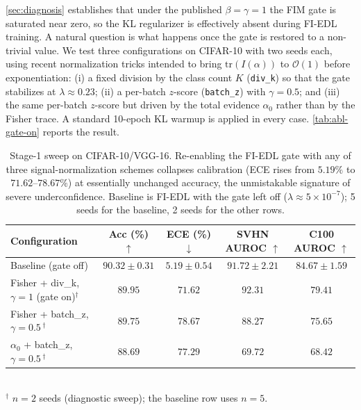 \documentclass[review,5p,times]{elsarticle}
\begin{document}
\autoref{sec:diagnosis} establishes that under the published
$\beta\!=\!\gamma\!=\!1$ the FIM gate is saturated near zero, so the KL
regularizer is effectively absent during FI-EDL training. A natural
question is what happens once the gate is restored to a non-trivial value.
We test three configurations on CIFAR-10 with two seeds each, using
recent normalization tricks intended to bring $\mathrm{tr}(I(\alpha))$ to
$\mathcal{O}(1)$ before exponentiation: (i) a fixed division by the class
count $K$ (\texttt{div\_k}) so that the gate stabilizes at
$\lambda\!\approx\!0.23$; (ii) a per-batch $z$-score
(\texttt{batch\_z}) with $\gamma\!=\!0.5$; and (iii) the same per-batch
$z$-score but driven by the total evidence $\alpha_0$ rather than by the
Fisher trace. A standard 10-epoch KL warmup is applied in every case.
\autoref{tab:abl-gate-on} reports the result.

\begin{table}[t]
  \centering
  \caption{Stage-1 sweep on CIFAR-10/VGG-16. Re-enabling the FI-EDL gate
    with any of three signal-normalization schemes collapses calibration
    (ECE rises from $5.19\%$ to $71.62$--$78.67\%$) at essentially
    unchanged accuracy, the unmistakable signature of severe
    underconfidence. Baseline is FI-EDL with the gate left off
    ($\lambda\!\approx\!5\!\times\!10^{-7}$); 5 seeds for the baseline,
    2 seeds for the other rows.}
  \label{tab:abl-gate-on}
  \small
  \begin{tabular}{lcccc}
    \toprule
    Configuration & Acc (\%) $\uparrow$ & ECE (\%) $\downarrow$
      & SVHN AUROC $\uparrow$ & C100 AUROC $\uparrow$ \\
    \midrule
    Baseline (gate off)
      & $90.32\!\pm\!0.31$ & $\mathbf{5.19\!\pm\!0.54}$
      & $\mathbf{91.72\!\pm\!2.21}$ & $\mathbf{84.67\!\pm\!1.59}$ \\
    Fisher + div\_k, $\gamma\!=\!1$ (gate on)$^{\dagger}$
      & $89.95$ & $71.62$ & $92.31$ & $79.41$ \\
    Fisher + batch\_z, $\gamma\!=\!0.5\,^{\dagger}$
      & $89.75$ & $78.67$ & $88.27$ & $75.65$ \\
    $\alpha_0$ + batch\_z, $\gamma\!=\!0.5\,^{\dagger}$
      & $88.69$ & $77.29$ & $69.72$ & $68.42$ \\
    \bottomrule
  \end{tabular}
  \\ {\footnotesize $^{\dagger}$ $n\!=\!2$ seeds (diagnostic sweep); the
   baseline row uses $n\!=\!5$.}
\end{table}
\end{document}

